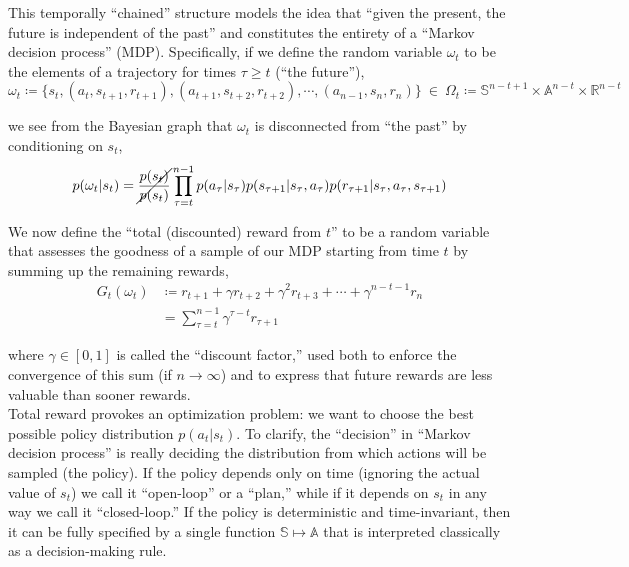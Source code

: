 This temporally ``chained'' structure models the idea that ``given the present, the future is independent of the past'' and constitutes the entirety of a ``Markov decision process'' (MDP). Specifically, if we define the random variable $\omega_t$ to be the elements of a trajectory for times $\tau \geq t$ (``the future''),
\begin{equation*}
\omega_t \coloneqq \{s_t, (a_t, s_{t+1}, r_{t+1}), (a_{t+1}, s_{t+2}, r_{t+2}), \cdots, (a_{n-1}, s_{n}, r_n)\} \ \in \ \Omega_t \coloneqq \mathbb{S}^{n-t+1} \times \mathbb{A}^{n-t} \times \mathbb{R}^{n-t}
\end{equation*}

we see from the Bayesian graph that $\omega_t$ is disconnected from ``the past'' by conditioning on $s_t$,
\begin{equation*}
p(\omega_t|s_t) = \cancel{\frac{p(s_t)}{p(s_t)}}\prod_{\tau=t}^{n-1} p(a_\tau|s_\tau)p(s_{\tau+1}|s_\tau,a_\tau)p(r_{\tau+1}|s_\tau,a_\tau,s_{\tau+1})
\end{equation*}

We now define the ``total (discounted) reward from $t$'' to be a random variable that assesses the goodness of a sample of our MDP starting from time $t$ by summing up the remaining rewards,
\begin{align*}
G_t(\omega_t) &\coloneqq r_{t+1} + \gamma r_{t+2} + \gamma^2 r_{t+3} + \cdots + \gamma^{n-t-1} r_n\\
&= \sum_{\tau=t}^{n-1} \gamma^{\tau-t} r_{\tau+1}
\end{align*}

where $\gamma \in [0,1]$ is called the ``discount factor,'' used both to enforce the convergence of this sum (if $n \to \infty$) and to express that future rewards are less valuable than sooner rewards.\\

Total reward provokes an optimization problem: we want to choose the best possible policy distribution $p(a_t|s_t)$. To clarify, the ``decision'' in ``Markov decision process'' is really deciding the distribution from which actions will be sampled (the policy). If the policy depends only on time (ignoring the actual value of $s_t$) we call it ``open-loop'' or a ``plan,'' while if it depends on $s_t$ in any way we call it ``closed-loop.'' If the policy is deterministic and time-invariant, then it can be fully specified by a single function $\mathbb{S} \mapsto \mathbb{A}$ that is interpreted classically as a decision-making rule.\\

